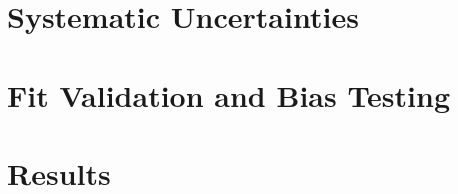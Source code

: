 \section{Systematic Uncertainties}
\label{sec:uncert}

\section{Fit Validation and Bias Testing}
\label{sec:bias}

\section{Results}
\label{sec:results}
